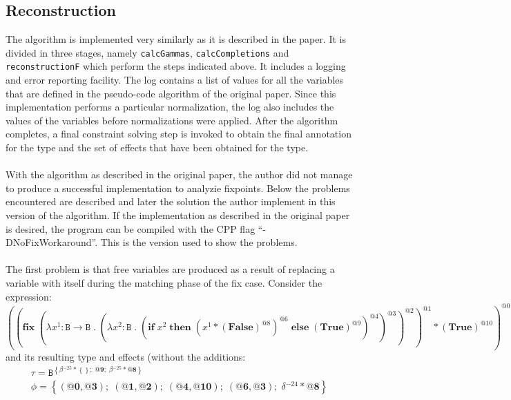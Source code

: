 \documentclass[8pt]{extarticle}
\begin{document}
\subsection{Reconstruction}
The algorithm is implemented very similarly as it is described in the paper. It is divided in three stages, namely \verb+calcGammas+, \verb+calcCompletions+ and \verb+reconstructionF+ which perform the steps indicated above. It includes a logging and error reporting facility. The log contains a list of values for all the variables that are defined in the pseudo-code algorithm of the original paper. Since this implementation performs a particular normalization, the log also includes the values of the variables before normalizations were applied. After the algorithm completes, a final constraint solving step is invoked to obtain the final annotation for the type and the set of effects that have been obtained for the type.
\\\\
With the algorithm as described in the original paper, the author did not manage to produce a successful implementation to analyzie fixpoints. Below the problems encountered are described and later the solution the author implement in this version of the algorithm. If the implementation as described in the original paper is desired, the program can be compiled with the CPP flag ``-DNoFixWorkaround''. This is the version used to show the problems.
\\\\
The first problem is that free variables are produced as a result of replacing a variable with itself during the matching phase of the fix case. Consider the expression:
\[
\left(\left(\mathbf{fix}\;{}\left(\lambda{}x^{1}:\mathtt{B}\to{}\mathtt{B}\;{}.\;{}\left(\lambda{}x^{2}:\mathtt{B}\;{}.\;{}\left(\mathbf{if}\;{}x^{2}\;{}\mathbf{then}\;{}\left(x^{1}*\left(\mathbf{False}\right)^{\mathit{@8}}\right)^{\mathit{@6}}\;{}\mathbf{else}\;{}\left(\mathbf{True}\right)^{\mathit{@9}}\right)^{\mathit{@4}}\right)^{\mathit{@3}}\right)^{\mathit{@2}}\right)^{\mathit{@1}}*\left(\mathbf{True}\right)^{\mathit{@10}}\right)^{\mathit{@0}}
\]
and its resulting type and effects (without the additions:
\[
\begin{array}{c}
\tau=\mathtt{B}^{\left\{\beta{}^{-25}*\left\{\right\};\;{}\textbf{@9};\;{}\beta{}^{-25}*\textbf{@8}\right\}} \\
\phi=\left\{\left(\textbf{@0},\textbf{@3}\right);\;{}\left(\textbf{@1},\textbf{@2}\right);\;{}\left(\textbf{@4},\textbf{@10}\right);\;{}\left(\textbf{@6},\textbf{@3}\right);\;{}\delta{}^{-24}*\textbf{@8}\right\}
\end{array}
\]
\end{document}
